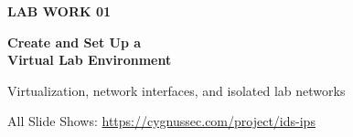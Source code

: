 \begin{frame}[plain]
  \vfill
  \begin{minipage}{0.84\textwidth}
    {\color{ResearchColor}\fontsize{18}{22}\selectfont\bfseries LAB WORK 01\par}
    \vspace{0.34cm}
    {\color{TitleColor}\fontsize{28}{34}\selectfont\bfseries
      Create and Set Up a\\
      Virtual Lab Environment\par}
    \vspace{0.40cm}
    {\color{SecondaryColor}\fontsize{16}{20}\selectfont
      Virtualization, network interfaces, and isolated lab networks\par}
  \end{minipage}
  \vfill
  {\color{SecondaryColor}\fontsize{12}{15}\selectfont All Slide Shows: \url{https://cygnussec.com/project/ids-ips}\par}
\end{frame}
